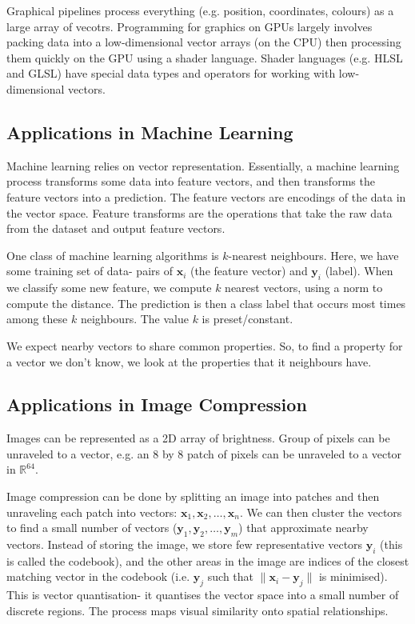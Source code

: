 \documentclass[a4paper, openany]{memoir}
\begin{document}
    Graphical pipelines process everything (e.g. position, coordinates, colours) as a large array of vecotrs. Programming for graphics on GPUs largely involves packing data into a low-dimensional vector arrays (on the CPU) then processing them quickly on the GPU using a shader language. Shader languages (e.g. HLSL and GLSL) have special data types and operators for working with low-dimensional vectors.

    \subsection{Applications in Machine Learning}
    Machine learning relies on vector representation. Essentially, a machine learning process transforms some data into feature vectors, and then transforms the feature vectors into a prediction. The feature vectors are encodings of the data in the vector space. Feature transforms are the operations that take the raw data from the dataset and output feature vectors.

    One class of machine learning algorithms is $k$-nearest neighbours. Here, we have some training set of data- pairs of $\mathbf{x}_i$ (the feature vector) and $\mathbf{y}_i$ (label). When we classify some new feature, we compute $k$ nearest vectors, using a norm to compute the distance. The prediction is then a class label that occurs most times among these $k$ neighbours. The value $k$ is preset/constant.

    We expect nearby vectors to share common properties. So, to find a property for a vector we don't know, we look at the properties that it neighbours have.

    \subsection{Applications in Image Compression}
    Images can be represented as a 2D array of brightness. Group of pixels can be unraveled to a vector, e.g. an 8 by 8 patch of pixels can be unraveled to a vector in $\mathbb{R}^{64}$.

    Image compression can be done by splitting an image into patches and then unraveling each patch into vectors: $\mathbf{x}_1, \mathbf{x}_2, \dots, \mathbf{x}_n$. We can then cluster the vectors to find a small number of vectors ($\mathbf{y}_1, \mathbf{y}_2, \dots, \mathbf{y}_m$) that approximate nearby vectors. Instead of storing the image, we store few representative vectors $\mathbf{y}_i$ (this is called the codebook), and the other areas in the image are indices of the closest matching vector in the codebook (i.e. $\mathbf{y}_j$ such that $\lVert \mathbf{x}_i - \mathbf{y}_j \rVert$ is minimised). This is vector quantisation- it quantises the vector space into a small number of discrete regions. The process maps visual similarity onto spatial relationships.
\end{document}
